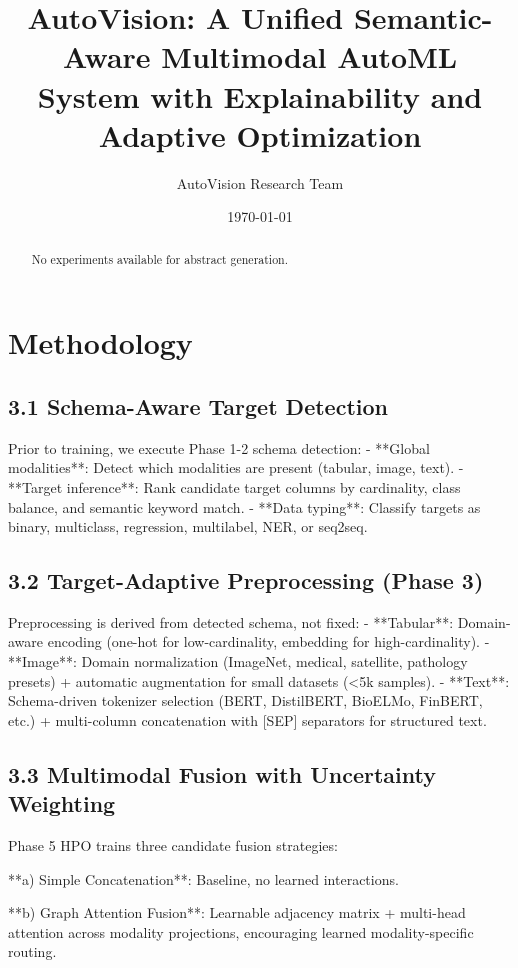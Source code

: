\documentclass{article}
\title{AutoVision: A Unified Semantic-Aware Multimodal AutoML System with Explainability and Adaptive Optimization}
\author{AutoVision Research Team}
\date{\today}
\begin{document}
\maketitle

\begin{abstract}
No experiments available for abstract generation.
\end{abstract}

\section{Methodology}

\subsection{3.1 Schema-Aware Target Detection}

Prior to training, we execute Phase 1-2 schema detection:
- **Global modalities**: Detect which modalities are present (tabular, image, text).
- **Target inference**: Rank candidate target columns by cardinality, class balance,
  and semantic keyword match.
- **Data typing**: Classify targets as binary, multiclass, regression, multilabel, NER, or seq2seq.

\subsection{3.2 Target-Adaptive Preprocessing (Phase 3)}

Preprocessing is derived from detected schema, not fixed:
- **Tabular**: Domain-aware encoding (one-hot for low-cardinality, embedding for high-cardinality).
- **Image**: Domain normalization (ImageNet, medical, satellite, pathology presets) +
  automatic augmentation for small datasets (<5k samples).
- **Text**: Schema-driven tokenizer selection (BERT, DistilBERT, BioELMo, FinBERT, etc.) +
  multi-column concatenation with [SEP] separators for structured text.

\subsection{3.3 Multimodal Fusion with Uncertainty Weighting}

Phase 5 HPO trains three candidate fusion strategies:

**a) Simple Concatenation**: Baseline, no learned interactions.

**b) Graph Attention Fusion**: Learnable adjacency matrix + multi-head attention
   across modality projections, encouraging learned modality-specific routing.
\end{document}
